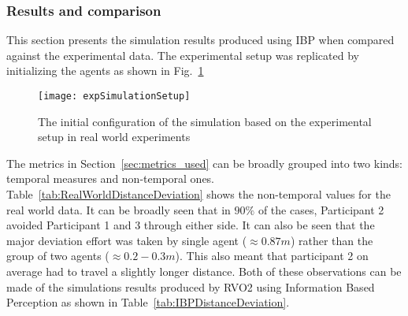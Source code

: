 

\subsubsection{Results and comparison} %
\label{sec:comparison_of_ibp}

This section presents the simulation results produced using IBP when compared against the experimental data. The experimental setup was replicated by initializing the agents as shown in Fig.~\ref{fig:experiment_simulation_setup}

\begin{figure}[!tbph]
    \begin{center}
        \texttt{[image: expSimulationSetup]}
    \end{center}
    \caption{The initial configuration of the simulation based on the experimental setup in real world experiments}
    \label{fig:experiment_simulation_setup}
\end{figure}


The metrics in Section~\ref{sec:metrics_used} can be broadly grouped into two kinds: temporal measures and non-temporal ones. Table~\ref{tab:RealWorldDistanceDeviation} shows the non-temporal values for the real world data. It can be broadly seen that in $90\%$ of the cases, Participant 2 avoided Participant 1 and 3 through either side. It can also be seen that the major deviation effort was taken by single agent ($\approx 0.87m$) rather than the group of two agents ($\approx 0.2 -0.3m$). This also meant that participant 2 on average had to travel a slightly longer distance. Both of these observations can be made of the simulations results produced by RVO2 using Information Based Perception as shown in Table~\ref{tab:IBPDistanceDeviation}.


